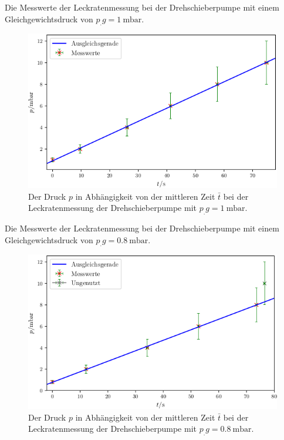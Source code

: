 \newpage
\begin{table}
\centering
\caption{Die Messwerte der Leckratenmessung bei der Drehschieberpumpe mit einem Gleichgewichtsdruck von $p_.g = \SI{1}{\milli\bar}$.}

\label{tab:DL1}
\end{table}

\begin{figure}
\centering
\includegraphics[width=\linewidth-70pt,height=\textheight-70pt,keepaspectratio]{content/images/DL1.png}
\caption{Der Druck $p$ in Abhängigkeit von der mittleren Zeit $\bar{t}$ bei der Leckratenmessung der Drehschieberpumpe  mit $p_.g = \SI{1}{\milli\bar}$.}
\label{fig:DL1}
\end{figure}

\newpage
\begin{table}
\centering
\caption{Die Messwerte der Leckratenmessung bei der Drehschieberpumpe mit einem Gleichgewichtsdruck von $p_.g = \SI{0.8}{\milli\bar}$.}

\label{tab:DL2}
\end{table}

\begin{figure}
\centering
\includegraphics[width=\linewidth-70pt,height=\textheight-70pt,keepaspectratio]{content/images/DL2.png}
\caption{Der Druck $p$ in Abhängigkeit von der mittleren Zeit $\bar{t}$ bei der Leckratenmessung der Drehschieberpumpe  mit $p_.g = \SI{0.8}{\milli\bar}$.}
\label{fig:DL2}
\end{figure}

